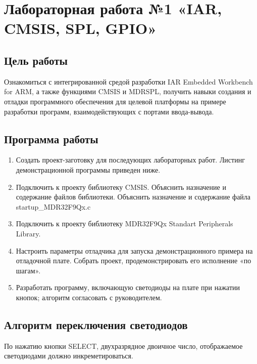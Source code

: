 \documentclass[14pt,a4paper,report]{report}
\begin{document}
\chapter {Лабораторная работа №1 «IAR, CMSIS, SPL, GPIO»}

\section {Цель работы}

Ознакомиться с интегрированной средой разработки IAR Embedded Workbench for ARM, а также функциями CMSIS и MDRSPL, получить навыки создания и отладки программного обеспечения для целевой платформы на примере разработки программ, взаимодействующих с портами ввода-вывода.

\section{Программа работы}

\begin{enumerate}
	\item Создать проект-заготовку для последующих лабораторных работ. Листинг демонстрационной программы приведен ниже.
	\item Подключить к проекту библиотеку CMSIS. Объяснить назначение и содержание файлов библиотеки. Объяснить назначение и содержание файла startup\_MDR32F9Qx.c
	\item Подключить к проекту библиотеку MDR32F9Qx Standart Peripherals Library.
	\item Настроить параметры отладчика для запуска демонстрационного примера на отладочной плате. Собрать проект, продемонстрировать его исполнение «по шагам».
	\item Разработать программу, включающую светодиоды на плате при нажатии кнопок; алгоритм согласовать с руководителем.
\end{enumerate}


%

\section{Алгоритм переключения светодиодов}

По нажатию кнопки SELECT, двухразрядное двоичное число, отображаемое светодиодами должно инкреметироваться. 
\end{document}

